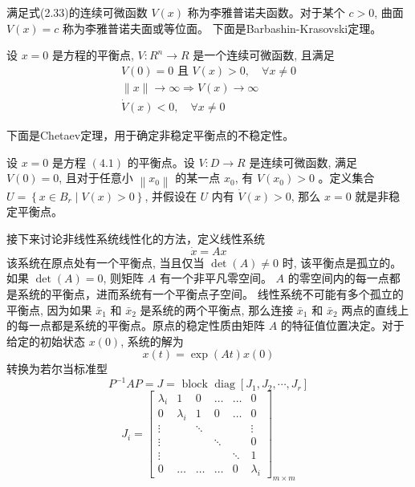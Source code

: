 满足式(2.33)的连续可微函数 $V(x)$ 称为李雅普诺夫函数。对于某个 $c>0$, 曲面 $V(x)=c$ 称为李雅普诺夫面或等位面。
下面是Barbashin-Krasovski定理。 
\begin{theorem}
    设 $x=0$ 是方程的平衡点, $V: R^n \rightarrow R$ 是一个连续可微函数, 且满足
    \begin{equation}
        \begin{gathered}
        V(0)=0 \text { 且 } V(x)>0, \quad \forall x \neq 0 \\
        \|x\| \rightarrow \infty \Rightarrow V(x) \rightarrow \infty \\
        \dot{V}(x)<0, \quad \forall x \neq 0
        \end{gathered}
     \end{equation}
\end{theorem}
下面是Chetaev定理，用于确定非稳定平衡点的不稳定性。
\begin{theorem}
    设 $x=0$ 是方程 $(4.1)$ 的平衡点。设 $V: D \rightarrow R$ 是连续可微函数, 满足 $V(0)=0$, 
    且对于任意小 $\left\|x_0\right\|$ 的某一点 $x_0$, 有 $V\left(x_0\right)>0$ 。定义集合 $U=\left\{x \in B_r \mid V(x)>0\right\}$,
    并假设在 $U$ 内有 $\dot{V}(x)>0$, 那么 $x=0$ 就是非稳定平衡点。
\end{theorem}
接下来讨论非线性系统线性化的方法，定义线性系统
\begin{equation}
    \dot{x}=A x
\end{equation}
该系统在原点处有一个平衡点, 当且仅当 $\operatorname{det}(A) \neq 0$ 时, 该平衡点是孤立的。
如果 $\operatorname{det}(A)=0$, 则矩阵 $A$ 有一个非平凡零空间。 $A$ 的零空间内的每一点都是系统的平衡点，进而系统有一个平衡点子空间。
线性系统不可能有多个孤立的平衡点, 因为如果 $\bar{x}_1$ 和 $\bar{x}_2$ 是系统的两个平衡点, 那么连接 $\bar{x}_1$ 和 $\bar{x}_2$ 
两点的直线上的每一点都是系统的平衡点。原点的稳定性质由矩阵 $A$ 的特征值位置决定。对于给定的初始状态 $x(0)$, 系统的解为
\begin{equation}
    x(t)=\exp (A t) x(0)
\end{equation}
转换为若尔当标准型
\begin{equation}
    P^{-1} A P=J=\text { block } \operatorname{diag}\left[J_1, J_2, \cdots, J_r\right]
\end{equation}
\begin{equation}
    J_i=\left[\begin{array}{cccccc}
    \lambda_i & 1 & 0 & \ldots & \ldots & 0 \\
    0 & \lambda_i & 1 & 0 & \ldots & 0 \\
    \vdots & & \ddots & & & \vdots \\
    \vdots & & & \ddots & & 0 \\
    \vdots & & & & \ddots & 1 \\
    0 & \ldots & \ldots & \ldots & 0 & \lambda_i
    \end{array}\right]_{m \times m}
\end{equation}

